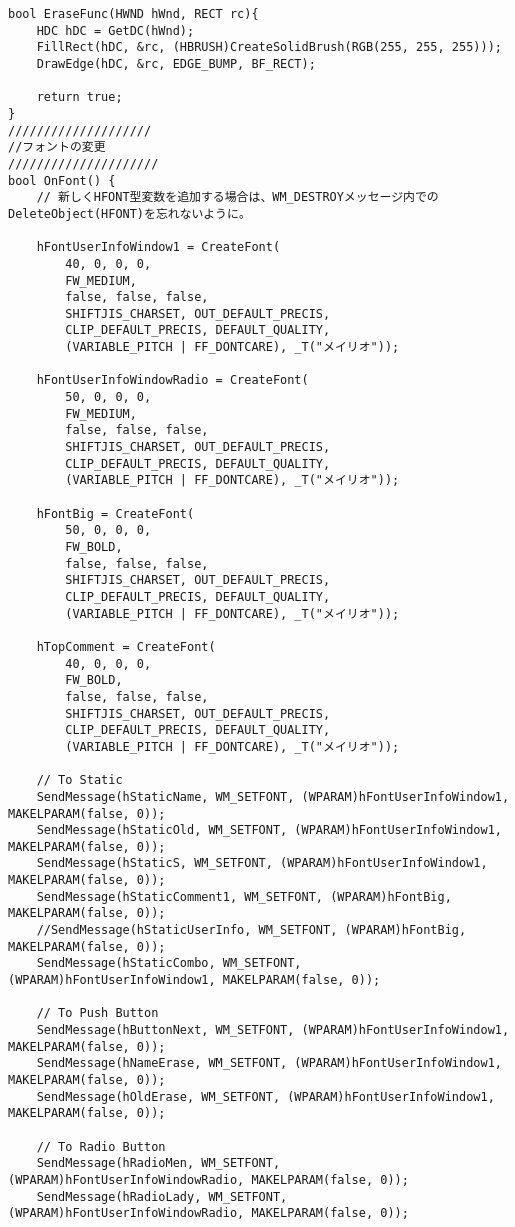 \begin{lstlisting}[caption=UserInfoWindow.cpp]
bool EraseFunc(HWND hWnd, RECT rc){
	HDC hDC = GetDC(hWnd);
	FillRect(hDC, &rc, (HBRUSH)CreateSolidBrush(RGB(255, 255, 255)));
	DrawEdge(hDC, &rc, EDGE_BUMP, BF_RECT);

	return true;
}
////////////////////
//フォントの変更
/////////////////////
bool OnFont() {
	// 新しくHFONT型変数を追加する場合は、WM_DESTROYメッセージ内でのDeleteObject(HFONT)を忘れないように。

	hFontUserInfoWindow1 = CreateFont(
		40, 0, 0, 0,
		FW_MEDIUM,
		false, false, false,
		SHIFTJIS_CHARSET, OUT_DEFAULT_PRECIS,
		CLIP_DEFAULT_PRECIS, DEFAULT_QUALITY,
		(VARIABLE_PITCH | FF_DONTCARE), _T("メイリオ"));

	hFontUserInfoWindowRadio = CreateFont(
		50, 0, 0, 0,
		FW_MEDIUM,
		false, false, false,
		SHIFTJIS_CHARSET, OUT_DEFAULT_PRECIS,
		CLIP_DEFAULT_PRECIS, DEFAULT_QUALITY,
		(VARIABLE_PITCH | FF_DONTCARE), _T("メイリオ"));

	hFontBig = CreateFont(
		50, 0, 0, 0,
		FW_BOLD,
		false, false, false,
		SHIFTJIS_CHARSET, OUT_DEFAULT_PRECIS,
		CLIP_DEFAULT_PRECIS, DEFAULT_QUALITY,
		(VARIABLE_PITCH | FF_DONTCARE), _T("メイリオ"));

	hTopComment = CreateFont(
		40, 0, 0, 0,
		FW_BOLD,
		false, false, false,
		SHIFTJIS_CHARSET, OUT_DEFAULT_PRECIS,
		CLIP_DEFAULT_PRECIS, DEFAULT_QUALITY,
		(VARIABLE_PITCH | FF_DONTCARE), _T("メイリオ"));

	// To Static
	SendMessage(hStaticName, WM_SETFONT, (WPARAM)hFontUserInfoWindow1, MAKELPARAM(false, 0));
	SendMessage(hStaticOld, WM_SETFONT, (WPARAM)hFontUserInfoWindow1, MAKELPARAM(false, 0));
	SendMessage(hStaticS, WM_SETFONT, (WPARAM)hFontUserInfoWindow1, MAKELPARAM(false, 0));
	SendMessage(hStaticComment1, WM_SETFONT, (WPARAM)hFontBig, MAKELPARAM(false, 0));
	//SendMessage(hStaticUserInfo, WM_SETFONT, (WPARAM)hFontBig, MAKELPARAM(false, 0));
	SendMessage(hStaticCombo, WM_SETFONT, (WPARAM)hFontUserInfoWindow1, MAKELPARAM(false, 0));

	// To Push Button
	SendMessage(hButtonNext, WM_SETFONT, (WPARAM)hFontUserInfoWindow1, MAKELPARAM(false, 0));
	SendMessage(hNameErase, WM_SETFONT, (WPARAM)hFontUserInfoWindow1, MAKELPARAM(false, 0));
	SendMessage(hOldErase, WM_SETFONT, (WPARAM)hFontUserInfoWindow1, MAKELPARAM(false, 0));

	// To Radio Button
	SendMessage(hRadioMen, WM_SETFONT, (WPARAM)hFontUserInfoWindowRadio, MAKELPARAM(false, 0));
	SendMessage(hRadioLady, WM_SETFONT, (WPARAM)hFontUserInfoWindowRadio, MAKELPARAM(false, 0));


\end{lstlisting}
